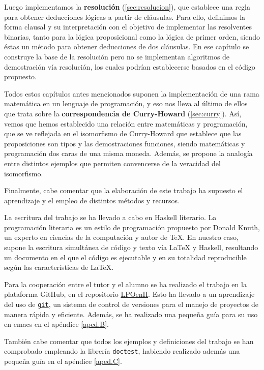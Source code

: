 Luego implementamos la \textbf{resolución} (\ref{sec:resolucion}), que
establece una regla para obtener deducciones lógicas a partir de
cláusulas. Para ello, definimos la forma clausal y su interpretación con el
objetivo de implementar las resolventes binarias, tanto para la lógica
proposicional como la lógica de primer orden, siendo éstas un método para
obtener deducciones de dos cláusulas. En ese capítulo se construye la base de
la resolución pero no se implementan algoritmos de demostración vía resolución,
los cuales podrían establecerse basados en el código propuesto.
  
Todos estos capítulos antes mencionados suponen la implementación de una rama
matemática en un lenguaje de programación, y eso nos lleva al último de ellos
que trata sobre la \textbf{correspondencia de Curry-Howard}
(\ref{sec:curry}). Así, vemos que hemos establecido una relación entre
matemáticas y programación, que se ve reflejada en el isomorfismo de
Curry-Howard que establece que las proposiciones son tipos y las demostraciones
funciones, siendo matemáticas y programación dos caras de una misma
moneda. Además, se propone la analogía entre distintos ejemplos que permiten
convencerse de la veracidad del isomorfismo.

\vspace{3mm}

Finalmente, cabe comentar que la elaboración de este trabajo ha supuesto el
aprendizaje y el empleo de distintos métodos y recursos.

La escritura del trabajo se ha llevado a cabo en Haskell literario. La
programación literaria es un estilo de programación propuesto por Donald Knuth,
un experto en ciencias de la computación y autor de TeX. En nuestro caso,
supone la escritura simultánea de código y texto vía LaTeX y Haskell,
resultando un documento en el que el código es ejecutable y en su totalidad
reproducible según las características de LaTeX.

Para la cooperación entre el tutor y el alumno se ha realizado el trabajo en la
plataforma GitHub, en el repositorio
\href{https://github.com/EduPH/LPOenH}{LPOenH}. Esto ha llevado a un
aprendizaje del uso de \href{https://git-scm.com/}{\texttt{git}}, un sistema de
control de versiones para el manejo de proyectos de manera rápida y
eficiente. Además, se ha realizado una pequeña guía para su uso en emacs en el
apéndice \ref{aped.B}.

También cabe comentar que todos los ejemplos y definiciones del trabajo se han
comprobado empleando la librería \texttt{doctest}, habiendo realizado además
una pequeña guía en el apéndice \ref{aped.C}.

